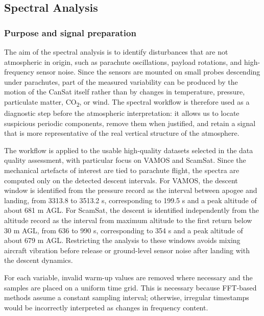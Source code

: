 \subsection{Spectral Analysis}

\subsubsection{Purpose and signal preparation}
The aim of the spectral analysis is to identify disturbances that are not atmospheric in origin, such as parachute oscillations, payload rotations, and high-frequency sensor noise. Since the sensors are mounted on small probes descending under parachutes, part of the measured variability can be produced by the motion of the CanSat itself rather than by changes in temperature, pressure, particulate matter, CO\textsubscript{2}, or wind. The spectral workflow is therefore used as a diagnostic step before the atmospheric interpretation: it allows us to locate suspicious periodic components, remove them when justified, and retain a signal that is more representative of the real vertical structure of the atmosphere.

The workflow is applied to the usable high-quality datasets selected in the data quality assessment, with particular focus on VAMOS and ScamSat. Since the mechanical artefacts of interest are tied to parachute flight, the spectra are computed only on the detected descent intervals. For VAMOS, the descent window is identified from the pressure record as the interval between apogee and landing, from 3313.8 to 3513.2 s, corresponding to 199.5 s and a peak altitude of about 681 m AGL. For ScamSat, the descent is identified independently from the altitude record as the interval from maximum altitude to the first return below 30 m AGL, from 636 to 990 s, corresponding to 354 s and a peak altitude of about 679 m AGL. Restricting the analysis to these windows avoids mixing aircraft vibration before release or ground-level sensor noise after landing with the descent dynamics.

For each variable, invalid warm-up values are removed where necessary and the samples are placed on a uniform time grid. This is necessary because FFT-based methods assume a constant sampling interval; otherwise, irregular timestamps would be incorrectly interpreted as changes in frequency content.

